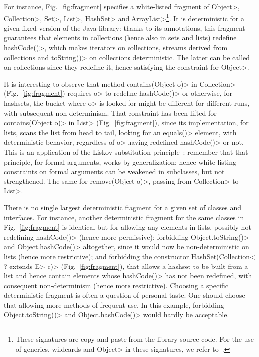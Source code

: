 For instance, Fig.~\ref{fig:fragment}
specifies a white-listed fragment of \<Object>,
\<Collection>, \<Set>, \<List>, \<HashSet> and
\<ArrayList>\footnote{These signatures are copy and paste from the
library source code. For the use of generics, wildcards and
\<Object> in these signatures, we refer to~\cite{NaftalinW06}.}.
It is deterministic for a given fixed version of the Java library:
thanks to its annotations, this fragment guarantees that elements in collections
(hence also in sets and lists) redefine \<hashCode()>, which makes iterators
on collections, streams derived from collections and \<toString()> on collections
deterministic. The latter can be called on collections since they redefine it,
hence satisfying the constraint for \<Object>.

It is interesting to observe that method
\<contains(Object o)> in \<Collection> (Fig.~\ref{fig:fragment})
requires \<o> to redefine \<hashCode()>
or otherwise, for hashsets, the bucket where \<o> is looked for might be different
for different runs, with subsequent non-determinism.
That constraint has been lifted for \<contains(Object o)> in \<List>
(Fig.~\ref{fig:fragment}), since its implementation, for lists,
scans the list from head to tail,
looking for an \<equals()> element, with deterministic behavior,
regardless of \<o> having redefined \<hashCode()> or not. This is an application
of the Liskov substitution principle~\cite{LiskovW94}:
remember that that principle, for formal arguments, works by generalization:
hence white-listing constraints on formal arguments can be weakened in subclasses,
but not strengthened. The same for \<remove(Object o)>, passing from
\<Collection> to \<List>.

There is no single largest deterministic fragment
for a given set of classes and interfaces. For instance, 
another deterministic fragment for the same classes in
Fig.~\ref{fig:fragment} is identical
but for allowing any elements in lists, possibly not redefining
\<hashCode()> (hence more permissive);
forbidding \<Object.toString()> and \<Object.hashCode()> altogether,
since it would now be non-deterministic on lists (hence
more restrictive); and forbidding the constructor
\<HashSet(Collection$\text{<}$? extends E$\text{>}$ c)>
(Fig.~\ref{fig:fragment}), that allows a hashset to be
built from a list and hence contain elements whose \<hashCode()> has not been redefined,
with consequent non-determinism (hence more restrictive). Choosing a specific
deterministic fragment is often a question of personal taste.
One should choose that allowing more methods of frequent use. In this example,
forbidding \<Object.toString()> and \<Object.hashCode()> would hardly be acceptable.
